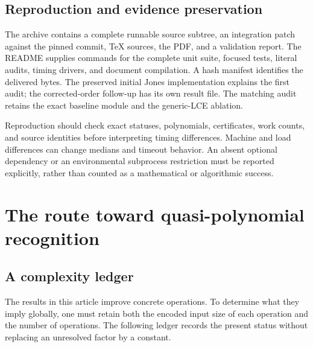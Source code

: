 \documentclass[11pt]{article}
\theoremstyle{definition}
\theoremstyle{remark}
\begin{document}
\subsection{Reproduction and evidence preservation}

The archive contains a complete runnable source subtree, an integration
patch against the pinned commit, TeX sources, the PDF, and a validation
report. The README supplies commands for the complete unit suite, focused
tests, literal audits, timing drivers, and document compilation. A hash
manifest identifies the delivered bytes. The preserved initial Jones
implementation explains the first audit; the corrected-order follow-up
has its own result file. The matching audit retains the exact baseline
module and the generic-LCE ablation.

Reproduction should check exact statuses, polynomials, certificates, work
counts, and source identities before interpreting timing differences.
Machine and load differences can change medians and timeout behavior.
An absent optional dependency or an environmental subprocess restriction
must be reported explicitly, rather than counted as a mathematical or
algorithmic success.

\section{The route toward quasi-polynomial recognition}
\label{sec:research}

\subsection{A complexity ledger}

The results in this article improve concrete operations. To determine what
they imply globally, one must retain both the encoded input size of each
operation and the number of operations. The following ledger records the
present status without replacing an unresolved factor by a constant.
\end{document}
